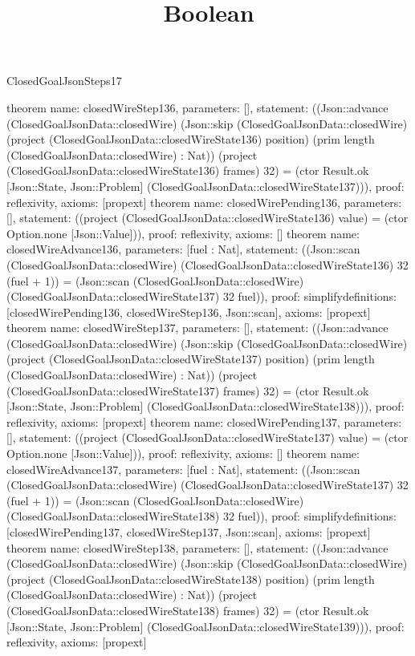 \begin{lexlean}{ClosedGoalJsonSteps17}
\title{Boolean}
\begin{semanticmodule}
theorem{
 name: closedWireStep136, parameters: [],
 statement: ((Json::advance (ClosedGoalJsonData::closedWire) (Json::skip (ClosedGoalJsonData::closedWire) (project (ClosedGoalJsonData::closedWireState136) position) (prim length (ClosedGoalJsonData::closedWire) : Nat)) (project (ClosedGoalJsonData::closedWireState136) frames) 32) = (ctor Result.ok [Json::State, Json::Problem] (ClosedGoalJsonData::closedWireState137))), proof: reflexivity{}, axioms: [propext]
}
theorem{
 name: closedWirePending136, parameters: [],
 statement: ((project (ClosedGoalJsonData::closedWireState136) value) = (ctor Option.none [Json::Value])), proof: reflexivity{}, axioms: []
}
theorem{
 name: closedWireAdvance136, parameters: [fuel : Nat],
 statement: ((Json::scan (ClosedGoalJsonData::closedWire) (ClosedGoalJsonData::closedWireState136) 32 (fuel + 1)) = (Json::scan (ClosedGoalJsonData::closedWire) (ClosedGoalJsonData::closedWireState137) 32 fuel)), proof: simplify{definitions: [closedWirePending136, closedWireStep136, Json::scan]}, axioms: [propext]
}
theorem{
 name: closedWireStep137, parameters: [],
 statement: ((Json::advance (ClosedGoalJsonData::closedWire) (Json::skip (ClosedGoalJsonData::closedWire) (project (ClosedGoalJsonData::closedWireState137) position) (prim length (ClosedGoalJsonData::closedWire) : Nat)) (project (ClosedGoalJsonData::closedWireState137) frames) 32) = (ctor Result.ok [Json::State, Json::Problem] (ClosedGoalJsonData::closedWireState138))), proof: reflexivity{}, axioms: [propext]
}
theorem{
 name: closedWirePending137, parameters: [],
 statement: ((project (ClosedGoalJsonData::closedWireState137) value) = (ctor Option.none [Json::Value])), proof: reflexivity{}, axioms: []
}
theorem{
 name: closedWireAdvance137, parameters: [fuel : Nat],
 statement: ((Json::scan (ClosedGoalJsonData::closedWire) (ClosedGoalJsonData::closedWireState137) 32 (fuel + 1)) = (Json::scan (ClosedGoalJsonData::closedWire) (ClosedGoalJsonData::closedWireState138) 32 fuel)), proof: simplify{definitions: [closedWirePending137, closedWireStep137, Json::scan]}, axioms: [propext]
}
theorem{
 name: closedWireStep138, parameters: [],
 statement: ((Json::advance (ClosedGoalJsonData::closedWire) (Json::skip (ClosedGoalJsonData::closedWire) (project (ClosedGoalJsonData::closedWireState138) position) (prim length (ClosedGoalJsonData::closedWire) : Nat)) (project (ClosedGoalJsonData::closedWireState138) frames) 32) = (ctor Result.ok [Json::State, Json::Problem] (ClosedGoalJsonData::closedWireState139))), proof: reflexivity{}, axioms: [propext]
}
\end{semanticmodule}
\end{lexlean}
